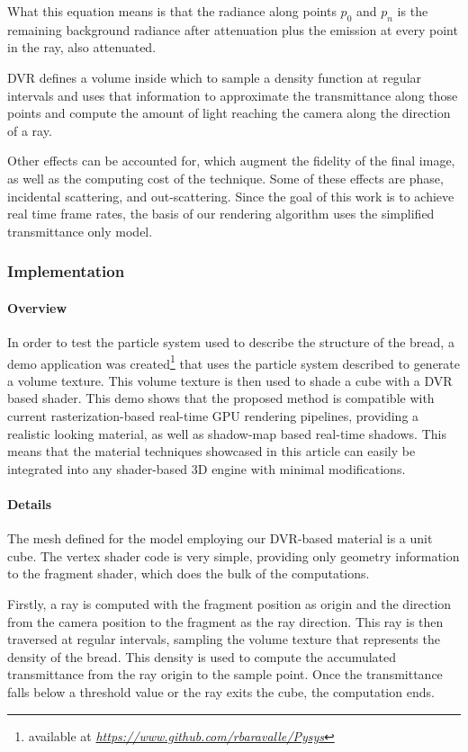 \documentclass[oneside,a4paper,english,links]{amca}
\begin{document}
What this equation means is that the radiance along points $p_0$ and
$p_n$ is the remaining background radiance after attenuation plus the
emission at every point in the ray, also attenuated.

DVR defines a volume inside which to sample a density function at
regular intervals and uses that information to approximate the
transmittance along those points and compute the amount of light
reaching the camera along the direction of a ray. 

Other effects can be accounted for, which augment the fidelity of the
final image, as well as the computing cost of the technique. Some of
these effects are phase, incidental scattering, and
out-scattering. Since the goal of this work is to achieve real time
frame rates, the basis of our rendering algorithm uses the simplified
transmittance only model.

\subsubsection{Implementation}

\paragraph{Overview}

In order to test the particle system used to describe the structure of
the bread, a demo application was created\footnote{available at
  \emph{\url{https://www.github.com/rbaravalle/Pysys}}} that uses the particle
system described to generate a volume texture. This volume texture is
then used to shade a cube with a DVR based shader. This demo shows
that the proposed method is compatible with current
rasterization-based real-time GPU rendering pipelines, providing a
realistic looking material, as well as shadow-map based real-time
shadows. This means that the material techniques showcased in this
article  can easily be integrated into any shader-based 3D engine with
minimal modifications.

\paragraph{Details}

The mesh defined for the model employing our DVR-based material is a unit
cube. The vertex shader code is very simple, providing only geometry
information to the fragment shader, which does the bulk of the
computations. 

Firstly, a ray is computed with the fragment position as origin and
the direction from the camera position to the fragment as the ray
direction. This ray is then traversed at regular intervals, sampling
the volume texture that represents the density of the bread. This
density is used to compute the accumulated transmittance from the ray
origin to the sample point. Once the transmittance falls below a
threshold value or the ray exits the cube, the computation ends.
\end{document}
